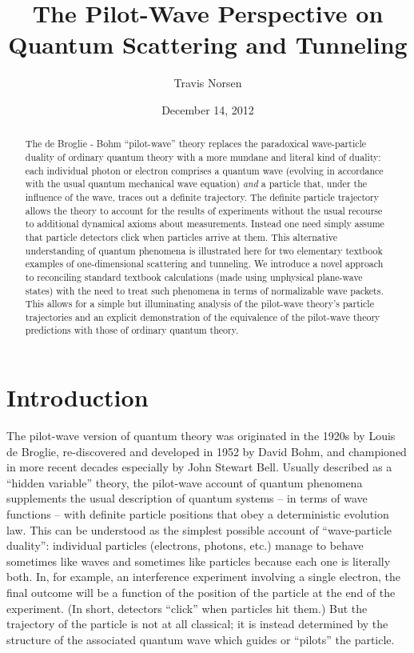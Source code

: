 \documentclass[aps,prc,twocolumn,letterpaper,floatfix]{revtex4}
\begin{document}
\title{The Pilot-Wave Perspective on Quantum Scattering and Tunneling}
\author{Travis Norsen}

\date{December 14, 2012}

\begin{abstract}
The de Broglie - Bohm ``pilot-wave'' theory replaces the paradoxical
wave-particle duality of ordinary quantum theory with a more mundane
and literal kind of duality:  each individual photon or electron comprises
a quantum wave (evolving in accordance with the usual quantum mechanical wave
equation) \emph{and} a particle that, under the influence of the wave, 
traces out a definite trajectory.  The definite particle trajectory
allows the theory to account for the results of experiments without
the usual recourse to additional dynamical axioms about measurements.
Instead one need simply assume that particle detectors click when particles
arrive at them.  This alternative understanding of
quantum phenomena is illustrated here for two elementary textbook
examples of one-dimensional scattering and tunneling.  We introduce a novel
approach to reconciling standard textbook calculations (made using
unphysical plane-wave states) with the need
to treat such phenomena in terms of normalizable wave packets.  This
allows for a simple but illuminating analysis of the pilot-wave
theory's particle trajectories and an explicit demonstration of the
equivalence of the pilot-wave theory
predictions with those of ordinary quantum theory.  
\end{abstract}

\maketitle


\section{Introduction}

The pilot-wave version of quantum theory was originated in the
1920s by Louis de Broglie, re-discovered and developed in 1952 by
David Bohm, and championed in more recent decades especially by John
Stewart Bell. \cite{dbb} Usually described as a ``hidden variable'' theory, the
pilot-wave account of quantum phenomena supplements the usual
description of quantum systems -- in terms of wave functions -- with
definite particle positions that obey a deterministic evolution law.
This can be understood as the simplest possible account of
``wave-particle duality'':  individual particles (electrons,
photons, etc.) manage to behave sometimes like waves and sometimes
like particles because each one is literally both.  In, for example,
an interference experiment involving a single electron, the final
outcome will be a function of the position of the particle at the end
of the experiment.  (In short, detectors ``click'' when particles hit them.)
But the trajectory of the particle is not at all classical; it
is instead determined by the structure of the associated quantum wave
which guides or ``pilots'' the particle.
\end{document}

